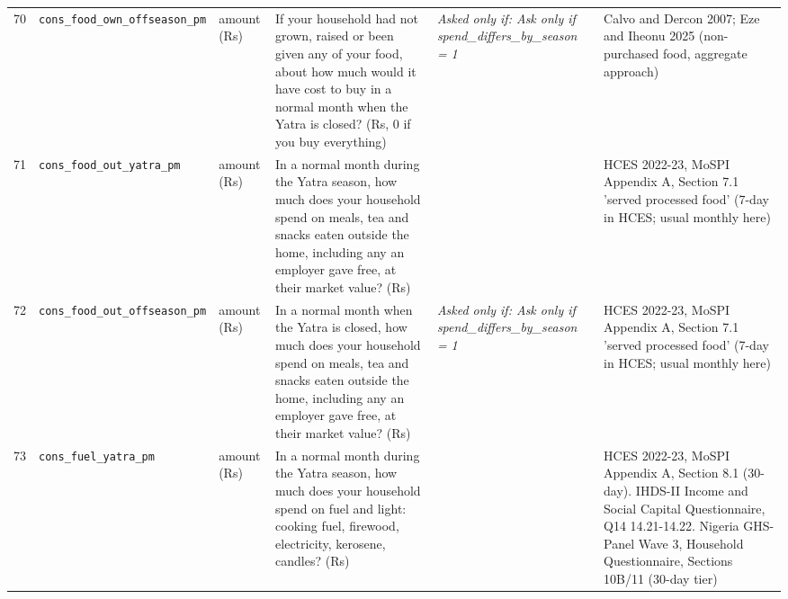 \documentclass[9pt,a4paper,landscape]{article}
\begin{document}
\begin{longtable}{@{}p{0.5cm}p{3.3cm}p{1.7cm}p{7.3cm}p{5.6cm}p{5.4cm}@{}}
\footnotesize 70 & \footnotesize\texttt{cons\_food\_own\_offseason\_pm} & \scriptsize amount (Rs) & \footnotesize If your household had not grown, raised or been given any of your food, about how much would it have cost to buy in a normal month when the Yatra is closed? (Rs, 0 if you buy everything)\par\vspace{1pt}{\footnotesize\color{hdr}{\hifont अगर आपका घर अपना खाना ख़ुद न उगाता, न पालता और न किसी से मिलता, तो जब यात्रा बंद रहती है उस आम महीने में उसे ख़रीदने में लगभग कितना लगता? (रुपये, सब ख़रीदते हों तो 0)}} & \scriptsize \textit{Asked only if: Ask only if spend\_differs\_by\_season = 1} & \scriptsize Calvo and Dercon 2007; Eze and Iheonu 2025 (non-purchased food, aggregate approach)\\
\footnotesize 71 & \footnotesize\texttt{cons\_food\_out\_yatra\_pm} & \scriptsize amount (Rs) & \footnotesize In a normal month during the Yatra season, how much does your household spend on meals, tea and snacks eaten outside the home, including any an employer gave free, at their market value? (Rs)\par\vspace{1pt}{\footnotesize\color{hdr}{\hifont यात्रा के मौसम के आम महीने में, आप (और जो यहाँ आपके साथ रहते हैं) बाहर खाए गए खाने, चाय और नाश्ते पर, मालिक ने मुफ़्त दिया हो तो उसकी क़ीमत मिलाकर कितना ख़र्च करते हैं? (रुपये)}} & \scriptsize  & \scriptsize HCES 2022-23, MoSPI Appendix A, Section 7.1 'served processed food' (7-day in HCES; usual monthly here)\\
\footnotesize 72 & \footnotesize\texttt{cons\_food\_out\_offseason\_pm} & \scriptsize amount (Rs) & \footnotesize In a normal month when the Yatra is closed, how much does your household spend on meals, tea and snacks eaten outside the home, including any an employer gave free, at their market value? (Rs)\par\vspace{1pt}{\footnotesize\color{hdr}{\hifont जब यात्रा बंद रहती है, उस आम महीने में आपका घर बाहर खाए गए खाने, चाय और नाश्ते पर, मालिक ने मुफ़्त दिया हो तो उसकी क़ीमत मिलाकर कितना ख़र्च करता है? (रुपये)}} & \scriptsize \textit{Asked only if: Ask only if spend\_differs\_by\_season = 1} & \scriptsize HCES 2022-23, MoSPI Appendix A, Section 7.1 'served processed food' (7-day in HCES; usual monthly here)\\
\footnotesize 73 & \footnotesize\texttt{cons\_fuel\_yatra\_pm} & \scriptsize amount (Rs) & \footnotesize In a normal month during the Yatra season, how much does your household spend on fuel and light: cooking fuel, firewood, electricity, kerosene, candles? (Rs)\par\vspace{1pt}{\footnotesize\color{hdr}{\hifont यात्रा के मौसम के आम महीने में, आप (और जो यहाँ आपके साथ रहते हैं) ईंधन और रोशनी पर: खाना बनाने की गैस, लकड़ी, बिजली, मिट्टी का तेल, मोमबत्ती कितना ख़र्च करते हैं? (रुपये)}} & \scriptsize  & \scriptsize HCES 2022-23, MoSPI Appendix A, Section 8.1 (30-day). IHDS-II Income and Social Capital Questionnaire, Q14 14.21-14.22. Nigeria GHS-Panel Wave 3, Household Questionnaire, Sections 10B/11 (30-day tier)\\

\end{longtable}
\end{document}
